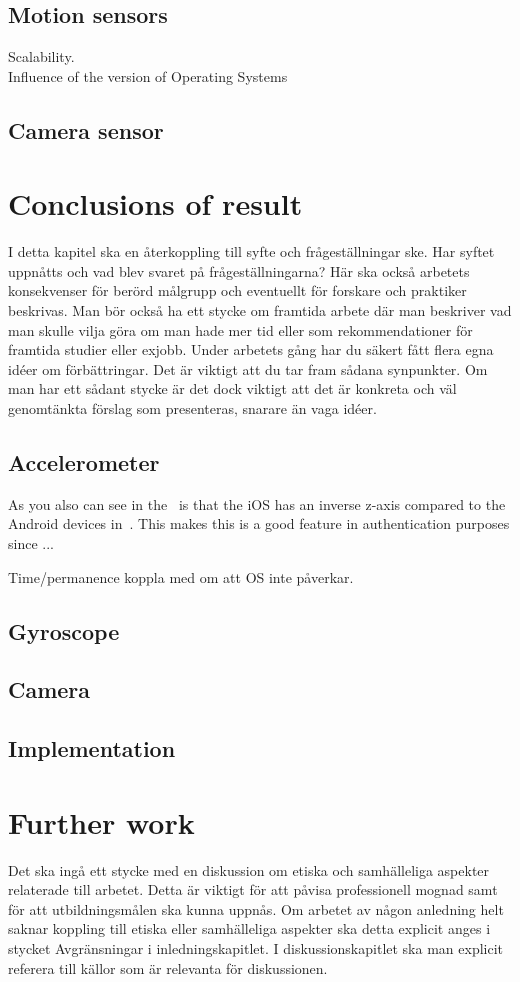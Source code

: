 \subsection{Motion sensors}
Scalability.\\
Influence of the version of Operating Systems \\

\subsection{Camera sensor}


\section{Conclusions of result}\label{sec:conclusion}
I detta kapitel ska en återkoppling till syfte och frågeställningar ske. Har syftet uppnåtts
och vad blev svaret på frågeställningarna? Här ska också arbetets konsekvenser för
berörd målgrupp och eventuellt för forskare och praktiker beskrivas.
Man bör också ha ett stycke om framtida arbete där man beskriver vad man skulle vilja
göra om man hade mer tid eller som rekommendationer för framtida studier eller exjobb.
Under arbetets gång har du säkert fått flera egna idéer om förbättringar. Det är viktigt att
du tar fram sådana synpunkter. Om man har ett sådant stycke är det dock viktigt att det är
konkreta och väl genomtänkta förslag som presenteras, snarare än vaga idéer.
\subsection{Accelerometer}\label{sec:concl:acc}
As you also can see in the~ is that the iOS has an inverse z-axis compared to the Android devices in~. This makes this is a good feature in authentication purposes since ...

Time/permanence koppla med \cite{sensor:accelPrint} om att OS inte påverkar.
\subsection{Gyroscope}
\subsection{Camera}
\subsection{Implementation}

\section{Further work}
Det ska ingå ett stycke med en diskussion om etiska och samhälleliga aspekter relaterade
till arbetet. Detta är viktigt för att påvisa professionell mognad samt för att utbildningsmålen
ska kunna uppnås. Om arbetet av någon anledning helt saknar koppling till etiska eller
samhälleliga aspekter ska detta explicit anges i stycket Avgränsningar i inledningskapitlet.
I diskussionskapitlet ska man explicit referera till källor som är relevanta för diskussionen.